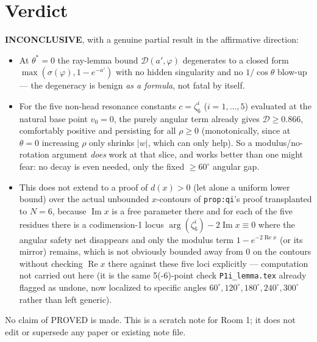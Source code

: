 \documentclass[11pt]{article}
\begin{document}
\section{Verdict}

\textbf{INCONCLUSIVE}, with a genuine partial result in the affirmative direction:

\begin{itemize}
\item At $\theta^*=0$ the ray-lemma bound $\mathcal D(a',\varphi)$ degenerates to a closed form
$\max(\sigma(\varphi),1-e^{-a'})$ with no hidden singularity and no $1/\cos\theta$ blow-up --- the
degeneracy is benign \emph{as a formula}, not fatal by itself.
\item For the five non-head resonance constants $c=\zeta_6^i$ ($i=1,\dots,5$) evaluated at the natural
base point $v_0=0$, the purely angular term already gives $\mathcal D\ge0.866$, comfortably positive and
persisting for all $\rho\ge0$ (monotonically, since at $\theta=0$ increasing $\rho$ only shrinks $|w|$,
which can only help). So a modulus/no-rotation argument \emph{does} work at that slice, and works better
than one might fear: no decay is even needed, only the fixed $\ge60^\circ$ angular gap.
\item This does not extend to a proof of $d(x)>0$ (let alone a uniform lower bound) over the actual
unbounded $x$-contours of \texttt{prop:qi}'s proof transplanted to $N=6$, because $\operatorname{Im}x$ is a
free parameter there and for each of the five residues there is a codimension-1 locus
$\arg(\zeta_6^i)-2\operatorname{Im}x\equiv0$ where the angular safety net disappears and only the modulus
term $1-e^{-2\operatorname{Re}x}$ (or its mirror) remains, which is not obviously bounded away from $0$ on
the contours without checking $\operatorname{Re}x$ there against these five loci explicitly ---
computation not carried out here (it is the same 5(-6)-point check \texttt{P1i\_lemma.tex} already flagged
as undone, now localized to specific angles $60^\circ,120^\circ,180^\circ,240^\circ,300^\circ$ rather than
left generic).
\end{itemize}

No claim of PROVED is made. This is a scratch note for Room 1; it does not edit or supersede any paper or
existing note file.
\end{document}
